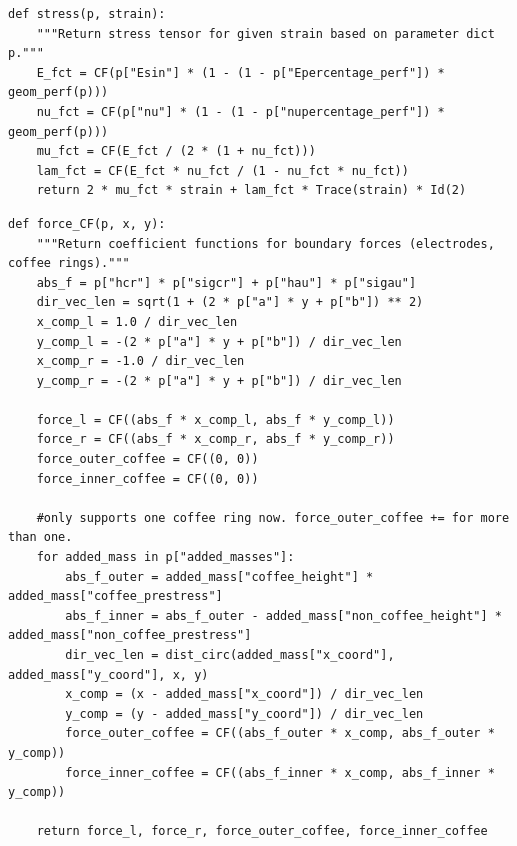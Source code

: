 \clearpage
\begin{verbatim}
def stress(p, strain):
    """Return stress tensor for given strain based on parameter dict p."""
    E_fct = CF(p["Esin"] * (1 - (1 - p["Epercentage_perf"]) * geom_perf(p)))
    nu_fct = CF(p["nu"] * (1 - (1 - p["nupercentage_perf"]) * geom_perf(p)))
    mu_fct = CF(E_fct / (2 * (1 + nu_fct)))
    lam_fct = CF(E_fct * nu_fct / (1 - nu_fct * nu_fct))
    return 2 * mu_fct * strain + lam_fct * Trace(strain) * Id(2)

\end{verbatim}
\clearpage
\begin{verbatim}
def force_CF(p, x, y):
    """Return coefficient functions for boundary forces (electrodes, coffee rings)."""
    abs_f = p["hcr"] * p["sigcr"] + p["hau"] * p["sigau"]
    dir_vec_len = sqrt(1 + (2 * p["a"] * y + p["b"]) ** 2)
    x_comp_l = 1.0 / dir_vec_len
    y_comp_l = -(2 * p["a"] * y + p["b"]) / dir_vec_len
    x_comp_r = -1.0 / dir_vec_len
    y_comp_r = -(2 * p["a"] * y + p["b"]) / dir_vec_len

    force_l = CF((abs_f * x_comp_l, abs_f * y_comp_l))
    force_r = CF((abs_f * x_comp_r, abs_f * y_comp_r))
    force_outer_coffee = CF((0, 0))
    force_inner_coffee = CF((0, 0))

    #only supports one coffee ring now. force_outer_coffee += for more than one.
    for added_mass in p["added_masses"]:
        abs_f_outer = added_mass["coffee_height"] * added_mass["coffee_prestress"]
        abs_f_inner = abs_f_outer - added_mass["non_coffee_height"] * added_mass["non_coffee_prestress"]
        dir_vec_len = dist_circ(added_mass["x_coord"], added_mass["y_coord"], x, y)
        x_comp = (x - added_mass["x_coord"]) / dir_vec_len
        y_comp = (y - added_mass["y_coord"]) / dir_vec_len
        force_outer_coffee = CF((abs_f_outer * x_comp, abs_f_outer * y_comp))
        force_inner_coffee = CF((abs_f_inner * x_comp, abs_f_inner * y_comp))

    return force_l, force_r, force_outer_coffee, force_inner_coffee
\end{verbatim}
\clearpage

